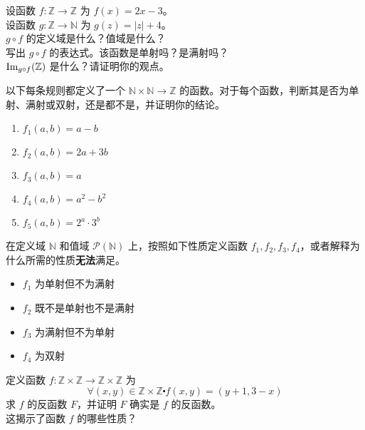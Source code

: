 \begin{exercise}
    设函数 $f : \mathbb{Z} \to \mathbb{Z}$ 为 $f(x) = 2x - 3$。\\
    设函数 $g : \mathbb{Z} \to \mathbb{N}$ 为 $g(z) = |z| + 4$。\\
    $g \circ f$ 的定义域是什么？值域是什么？\\
    写出 $g \circ f$ 的表达式。该函数是单射吗？是满射吗？\\
    $\text{Im}_{g \circ f}(\mathbb{Z})$ 是什么？请证明你的观点。
\end{exercise}

\begin{exercise}
    以下每条规则都定义了一个 $\mathbb{N} \times \mathbb{N} \to \mathbb{Z}$ 的函数。对于每个函数，判断其是否为单射、满射或双射，还是都不是，并证明你的结论。
    \begin{enumerate}[label=(\alph*)]
        \item $f_1(a, b) = a - b$
        \item $f_2(a, b) = 2a + 3b$
        \item $f_3(a, b) = a$
        \item $f_4(a, b) = a^2 - b^2$
        \item $f_5(a, b) = 2^a \cdot 3^b$
    \end{enumerate}
\end{exercise}

\begin{exercise}
    在定义域 $\mathbb{N}$ 和值域 $\mathcal{P}(\mathbb{N})$ 上，按照如下性质定义函数 $f_1, f_2, f_3, f_4$，或者解释为什么所需的性质\textbf{无法}满足。
    \begin{itemize}
        \item $f_1$ 为单射但不为满射
        \item $f_2$ 既不是单射也不是满射
        \item $f_3$ 为满射但不为单射
        \item $f_4$ 为双射
    \end{itemize}
\end{exercise}

\begin{exercise}
    定义函数 $f : \mathbb{Z} \times \mathbb{Z} \to \mathbb{Z} \times \mathbb{Z}$ 为
    \[\forall (x, y) \in \mathbb{Z} \times \mathbb{Z} \centerdot f(x, y) = (y + 1, 3 - x)\]
    求 $f$ 的反函数 $F$，并证明 $F$ 确实是 $f$ 的反函数。\\
    这揭示了函数 $f$ 的哪些性质？
\end{exercise}

